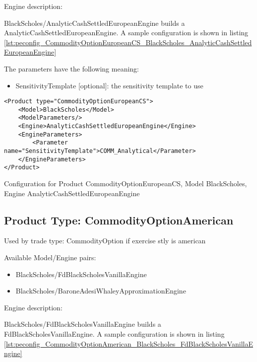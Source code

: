 Engine description:

BlackScholes/AnalyticCashSettledEuropeanEngine builds a AnalyticCashSettledEuropeanEngine. A sample configuration is shown in listing
\ref{lst:peconfig_CommodityOptionEuropeanCS_BlackScholes_AnalyticCashSettledEuropeanEngine}

The parameters have the following meaning:

\begin{itemize}
\item SensitivityTemplate [optional]: the sensitivity template to use 
\end{itemize}

\begin{longlisting}
\begin{verbatim}
<Product type="CommodityOptionEuropeanCS">
    <Model>BlackScholes</Model>
    <ModelParameters/>
    <Engine>AnalyticCashSettledEuropeanEngine</Engine>
    <EngineParameters>
        <Parameter name="SensitivityTemplate">COMM_Analytical</Parameter>
    </EngineParameters>
</Product>
\end{verbatim}
\caption{Configuration for Product CommodityOptionEuropeanCS, Model BlackScholes, Engine AnalyticCashSettledEuropeanEngine}
\label{lst:peconfig_CommodityOptionEuropeanCS_BlackScholes_AnalyticCashSettledEuropeanEngine}
\end{longlisting}

\subsection{Product Type: CommodityOptionAmerican}

Used by trade type: CommodityOption if exercise stly is american

Available Model/Engine pairs:

\begin{itemize}
\item BlackScholes/FdBlackScholesVanillaEngine
\item BlackScholes/BaroneAdesiWhaleyApproximationEngine
\end{itemize}

Engine description:

BlackScholes/FdBlackScholesVanillaEngine builds a FdBlackScholesVanillaEngine. A sample configuration is shown in listing
\ref{lst:peconfig_CommodityOptionAmerican_BlackScholes_FdBlackScholesVanillaEngine}

